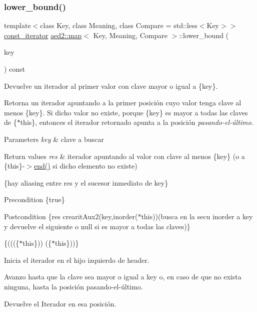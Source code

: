\subsubsection{\texorpdfstring{lower\+\_\+bound()}{lower\_bound()}\hspace{0.1cm}{\footnotesize\ttfamily [2/4]}}
{\footnotesize\ttfamily template$<$class Key, class Meaning, class Compare = std\+::less$<$\+Key$>$$>$ \\
\hyperlink{classaed2_1_1map_1_1const__iterator}{const\+\_\+iterator} \hyperlink{classaed2_1_1map}{aed2\+::map}$<$ Key, Meaning, Compare $>$\+::lower\+\_\+bound (\begin{DoxyParamCaption}\item[{const Key \&}]{key }\end{DoxyParamCaption}) const\hspace{0.3cm}{\ttfamily [inline]}}



Devuelve un iterador al primer valor con clave mayor o igual a \{key\}. 

Retorna un iterador apuntando a la primer posición cuyo valor tenga clave al menos \{key\}. Si dicho valor no existe, porque \{key\} es mayor a todas las claves de \{$\ast$this\}, entonces el iterador retornado apunta a la posición {\itshape pasando-\/el-\/último}.


\begin{DoxyParams}{Parameters}
{\em key} & clave a buscar \\
\hline
\end{DoxyParams}

\begin{DoxyRetVals}{Return values}
{\em res} & iterador apuntando al valor con clave al menos \{key\} (o a \{this\}-\/$>$\hyperlink{classaed2_1_1map_a76023e6a56cb625513e1b5ea028bf983}{end()} si dicho elemento no existe)\\
\hline
\end{DoxyRetVals}
\{hay aliasing entre res y el sucesor inmediato de key\}

\begin{DoxyPrecond}{Precondition}
\{true\} 
\end{DoxyPrecond}
\begin{DoxyPostcond}{Postcondition}
\{res  crearit\+Aux2(key,inorder($\ast$this))(busca en la secu inorder a key y devuelve el siguiente o null si es mayor a todas las claves)\}
\end{DoxyPostcond}
\{(((\{$\ast$this\}))  (\{$\ast$this\}))\}
\begin{DoxyItemize}
\item Inicia el iterador en el hijo izquierdo de header.
\item Avanzo hasta que la clave sea mayor o igual a key o, en caso de que no exista ninguna, hasta la posición pasando-\/el-\/último.
\item Devuelve el Iterador en esa posición. 
\end{DoxyItemize}\mbox{\label{classaed2_1_1map_a07b3dd65557c59ee085e5f211269c6b3}} 
